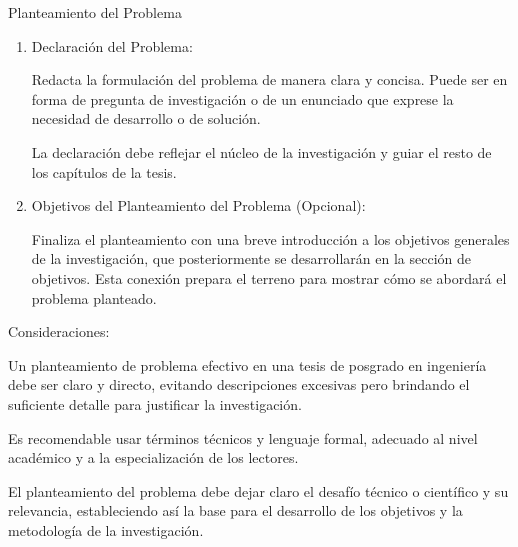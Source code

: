 \documentclass[9pt]{beamer}
\begin{document}
\begin{frame}{Planteamiento del Problema}
\begin{enumerate}
    Expón los efectos negativos que implicaría no resolver el problema identificado, ya sea en términos de pérdidas económicas, limitaciones tecnológicas, riesgo de seguridad, o falta de competitividad en el sector.

    Esta parte ayuda a fortalecer la necesidad de la investigación y a subrayar la importancia de encontrar una solución.

    \item Declaración del Problema:

    Redacta la formulación del problema de manera clara y concisa. Puede ser en forma de pregunta de investigación o de un enunciado que exprese la necesidad de desarrollo o de solución.

    La declaración debe reflejar el núcleo de la investigación y guiar el resto de los capítulos de la tesis.

    \item Objetivos del Planteamiento del Problema (Opcional):

    Finaliza el planteamiento con una breve introducción a los objetivos generales de la investigación, que posteriormente se desarrollarán en la sección de objetivos. Esta conexión prepara el terreno para mostrar cómo se abordará el problema planteado.
\end{enumerate}

Consideraciones:

Un planteamiento de problema efectivo en una tesis de posgrado en ingeniería debe ser claro y directo, evitando descripciones excesivas pero brindando el suficiente detalle para justificar la investigación.

Es recomendable usar términos técnicos y lenguaje formal, adecuado al nivel académico y a la especialización de los lectores.


El planteamiento del problema debe dejar claro el desafío técnico o científico y su relevancia, estableciendo así la base para el desarrollo de los objetivos y la metodología de la investigación.
\end{frame}
\end{document}

